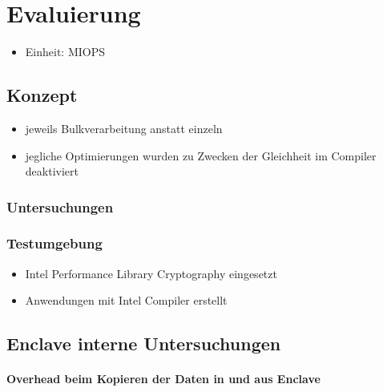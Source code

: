 
\chapter{Evaluierung}

\begin{itemize}
	\item Einheit: MIOPS
\end{itemize}

\section{Konzept}

\begin{itemize}
	\item jeweils Bulkverarbeitung anstatt einzeln
	\item jegliche Optimierungen wurden zu Zwecken der Gleichheit im Compiler deaktiviert
\end{itemize}

\subsection{Untersuchungen}
\subsection{Testumgebung}
\begin{itemize}
	\item Intel Performance Library Cryptography eingesetzt
	\item Anwendungen mit Intel Compiler erstellt
\end{itemize}

\section{Enclave interne Untersuchungen}
\subsubsection{Overhead beim Kopieren der Daten in und aus Enclave}

